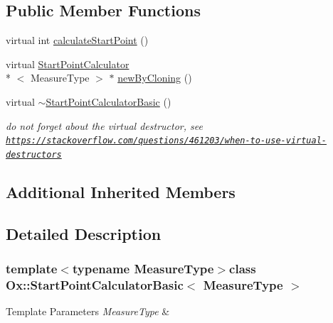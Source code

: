\subsection*{Public Member Functions}
\begin{DoxyCompactItemize}
\item 
virtual int \hyperlink{class_ox_1_1_start_point_calculator_basic_a9d227adf887f091f180f3e2fd37ab2cc}{calculate\-Start\-Point} ()
\item 
virtual \hyperlink{class_ox_1_1_start_point_calculator}{Start\-Point\-Calculator}\\*
$<$ Measure\-Type $>$ $\ast$ \hyperlink{class_ox_1_1_start_point_calculator_basic_a65bb3460d9358f3d9538648e221c8247}{new\-By\-Cloning} ()
\item 
\hypertarget{class_ox_1_1_start_point_calculator_basic_a7e55561e008088c26459c210e95b69e1}{virtual \hyperlink{class_ox_1_1_start_point_calculator_basic_a7e55561e008088c26459c210e95b69e1}{$\sim$\-Start\-Point\-Calculator\-Basic} ()}\label{class_ox_1_1_start_point_calculator_basic_a7e55561e008088c26459c210e95b69e1}

\begin{DoxyCompactList}\small\item\em do not forget about the virtual destructor, see \href{https://stackoverflow.com/questions/461203/when-to-use-virtual-destructors}{\tt https\-://stackoverflow.\-com/questions/461203/when-\/to-\/use-\/virtual-\/destructors} \end{DoxyCompactList}\end{DoxyCompactItemize}
\subsection*{Additional Inherited Members}


\subsection{Detailed Description}
\subsubsection*{template$<$typename Measure\-Type$>$class Ox\-::\-Start\-Point\-Calculator\-Basic$<$ Measure\-Type $>$}


\begin{DoxyTemplParams}{Template Parameters}
{\em Measure\-Type} & \\
\hline
\end{DoxyTemplParams}


